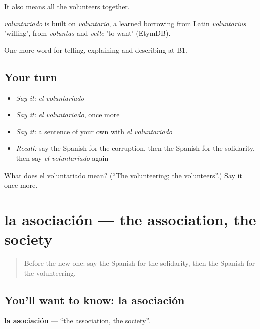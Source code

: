 It also means all the volunteers together.

\begin{cousinweb}
\emph{voluntariado} is built on \emph{voluntario}, a learned borrowing from Latin \emph{voluntarius} 'willing', from \emph{voluntas} and \emph{velle} 'to want' (EtymDB).
\end{cousinweb}

\begin{grammarlens}[title={What you've built}]
One more word for telling, explaining and describing at B1.
\end{grammarlens}

\subsection*{Your turn}
\begin{itemize}
\raggedright
  \item \emph{Say it:} \emph{el voluntariado}
  \item \emph{Say it:} \emph{el voluntariado}, once more
  \item \emph{Say it:} a sentence of your own with \emph{el voluntariado}
  \item \emph{Recall:} say the Spanish for the corruption, then the Spanish for the solidarity, then say \emph{el voluntariado} again
\end{itemize}

\begin{tcolorbox}[breakable,colback=teal!4,colframe=teal!35!black,title={Before you move on}]
What does el voluntariado mean? (\textquotedblleft{}The volunteering; the volunteers\textquotedblright{}.) Say it once more.
\end{tcolorbox}
\section[la asociación]{la asociación — the association, the society}

\label{lesson:ES-C606-asociacion}



\begin{quote}
Before the new one: say the Spanish for the solidarity, then the Spanish for the volunteering.
\end{quote}

\subsection*{You'll want to know: la asociación}
\textbf{la asociación} — \textquotedblleft{}the association, the society\textquotedblright{}.

